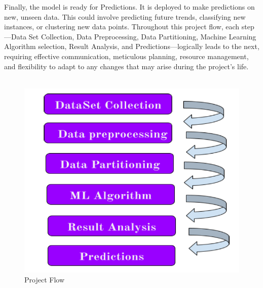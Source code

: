 Finally, the model is ready for Predictions. It is deployed to make predictions on new, unseen data. This could involve predicting future trends, classifying new instances, or clustering new data points. Throughout this project flow, each step—Data Set Collection, Data Preprocessing, Data Partitioning, Machine Learning Algorithm selection, Result Analysis, and Predictions—logically leads to the next, requiring effective communication, meticulous planning, resource management, and flexibility to adapt to any changes that may arise during the project's life.
\\
\\
\begin{figure}[htbp]
     \centering
     \includegraphics[width=0.8\linewidth]{fig1.png}
     \caption{ Project Flow}
 \end{figure}


